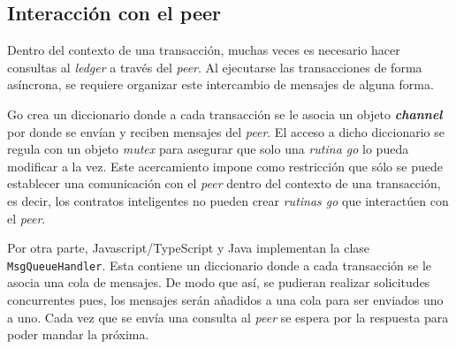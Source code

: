 \subsection{Interacción con el peer} 
Dentro del contexto de una transacción, muchas veces es necesario hacer consultas al \textit{ledger} a través del \textit{peer}. Al ejecutarse las transacciones de forma asíncrona, se requiere organizar este intercambio de mensajes de alguna forma. 

Go crea un diccionario donde a cada transacción se le asocia un objeto  \textbf{\textit{channel}} por donde se envían y reciben mensajes del \textit{peer}. El acceso a dicho diccionario se regula con un objeto \textit{mutex} para asegurar que solo una \textit{rutina go} lo pueda modificar a la vez. Este acercamiento impone como restricción que sólo se puede establecer una comunicación con el \textit{peer} dentro del contexto de una transacción, es decir, los contratos inteligentes no pueden crear \textit{rutinas go} que interactúen con el \textit{peer}.

Por otra parte, Javascript/TypeScript y Java implementan la clase \texttt{MsgQueueHandler}. Esta contiene un diccionario donde a cada transacción se le asocia una cola de mensajes. De modo que así, se pudieran realizar solicitudes concurrentes pues, los mensajes serán añadidos a una cola para ser enviados uno a uno. Cada vez que se envía una consulta al \textit{peer} se espera por la respuesta para poder mandar la próxima.


%


